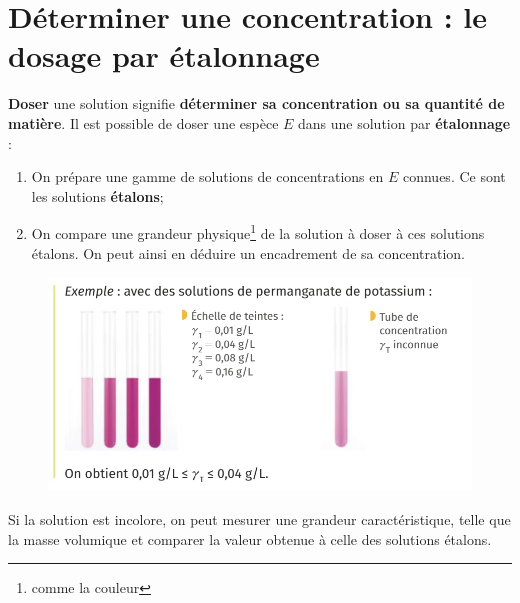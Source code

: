 \documentclass[french, a4paper, 12pt, twocolumn, landscape]{article}
\begin{document}


\section{Déterminer une concentration : le dosage par étalonnage}

\textbf{Doser} une solution signifie \og{}\textbf{déterminer sa concentration ou sa quantité de matière}\fg{}. Il est possible de doser une espèce $E$ dans une solution par \textbf{étalonnage} :

\begin{enumerate}
	\item On prépare une gamme de solutions de concentrations en $E$ connues. Ce sont les solutions \textbf{étalons};
	\item On compare une grandeur physique\footnote{comme la couleur} de la solution à doser à ces solutions étalons. On peut ainsi en déduire un encadrement de sa concentration.
\end{enumerate}

\begin{figure}[ht]
	\centering
	\includegraphics[width=.5\textwidth]{dosageparetalonnag.png}
\end{figure}

Si la solution est incolore, on peut mesurer une grandeur caractéristique, telle que la masse volumique et comparer la valeur obtenue à celle des solutions étalons.
\end{document}

